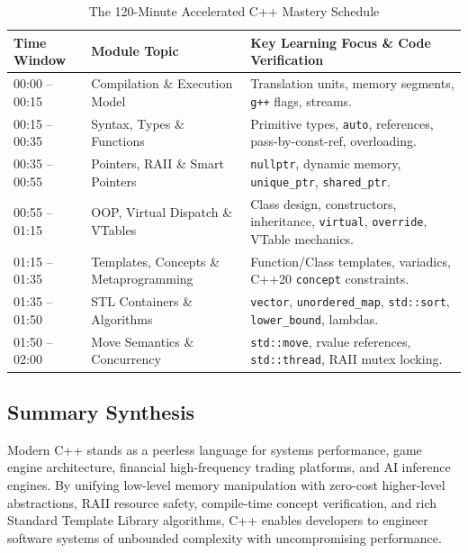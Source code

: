 \documentclass[10pt,journal,compsoc,onecolumn]{IEEEtran}
\begin{document}
\begin{table}[h]
\centering
\caption{The 120-Minute Accelerated C++ Mastery Schedule}
\label{tab:schedule}
\begin{tabular}{lll}
\toprule
\textbf{Time Window} & \textbf{Module Topic} & \textbf{Key Learning Focus \& Code Verification} \\
\midrule
00:00 -- 00:15 & Compilation \& Execution Model & Translation units, memory segments, \texttt{g++} flags, streams. \\
00:15 -- 00:35 & Syntax, Types \& Functions & Primitive types, \texttt{auto}, references, pass-by-const-ref, overloading. \\
00:35 -- 00:55 & Pointers, RAII \& Smart Pointers & \texttt{nullptr}, dynamic memory, \texttt{unique\_ptr}, \texttt{shared\_ptr}. \\
00:55 -- 01:15 & OOP, Virtual Dispatch \& VTables & Class design, constructors, inheritance, \texttt{virtual}, \texttt{override}, VTable mechanics. \\
01:15 -- 01:35 & Templates, Concepts \& Metaprogramming & Function/Class templates, variadics, C++20 \texttt{concept} constraints. \\
01:35 -- 01:50 & STL Containers \& Algorithms & \texttt{vector}, \texttt{unordered\_map}, \texttt{std::sort}, \texttt{lower\_bound}, lambdas. \\
01:50 -- 02:00 & Move Semantics \& Concurrency & \texttt{std::move}, rvalue references, \texttt{std::thread}, RAII mutex locking. \\
\bottomrule
\end{tabular}
\end{table}

\subsection{Summary Synthesis}
Modern C++ stands as a peerless language for systems performance, game engine architecture, financial high-frequency trading platforms, and AI inference engines. By unifying low-level memory manipulation with zero-cost higher-level abstractions, RAII resource safety, compile-time concept verification, and rich Standard Template Library algorithms, C++ enables developers to engineer software systems of unbounded complexity with uncompromising performance.
\end{document}
